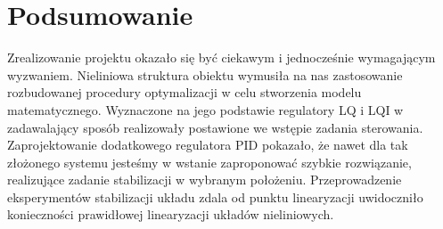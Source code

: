 \documentclass[11pt,a4paper]{article}
\begin{document}
\section{Podsumowanie}
Zrealizowanie projektu okazało się być ciekawym i jednocześnie wymagającym wyzwaniem. Nieliniowa struktura obiektu wymusiła na nas zastosowanie rozbudowanej procedury optymalizacji w celu stworzenia modelu matematycznego. Wyznaczone na jego podstawie regulatory LQ i LQI w zadawalający sposób realizowały postawione we wstępie zadania sterowania. Zaprojektowanie dodatkowego regulatora PID pokazało, że nawet dla tak złożonego systemu jesteśmy w wstanie zaproponować szybkie rozwiązanie, realizujące zadanie stabilizacji w wybranym położeniu. Przeprowadzenie eksperymentów stabilizacji układu zdala od punktu linearyzacji uwidoczniło konieczności prawidłowej linearyzacji układów nieliniowych.   
\end{document}
